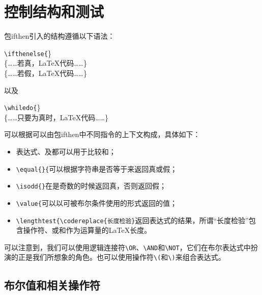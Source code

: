 \section{控制结构和测试}

包\textsf{ifthen}引入的结构遵循以下语法：

\begin{dmd}
\verb+\ifthenelse{+\}\\
\{……若真，\LaTeX 代码……\}\\
\{……若假，\LaTeX 代码……\}
\end{dmd}

以及

\begin{dmd}
\verb+\whiledo{+\}\\
\{……只要为真时，\LaTeX 代码……\}
\end{dmd}

可以根据可以由包\textsf{ifthen}中不同指令的上下文构成，具体如下：

\begin{itemize}
    \item 表达式\dm{>}、\dm{<}及\dm{=}都可以用于比较和；
    \item \verb+\equal{+\verb+}{+\dm{\}}可以根据字符串是否等于来返回真或假；
    \item \verb+\isodd{+\verb+}+在是奇数的时候返回真，否则返回假；
    \item \verb+\value{+\dm{\}}可以以可被布尔条件使用的形式返回的值；
    \item \verb+\lengthtest{\codereplace{长度检验}+\dm{\}}返回表达式的结果，所谓“长度检验”包含操作符\dm{>}、\dm{<}或\dm{=}和作为运算量的\LaTeX 长度。
\end{itemize}

可以注意到，我们可以使用逻辑连接符\verb+\OR+、\verb+\AND+和\verb+\NOT+，它们在布尔表达式中扮演的正是我们所想象的角色。也可以使用操作符\verb+\(+和\verb+\)+来组合表达式。

\subsection{布尔值和相关操作符}

